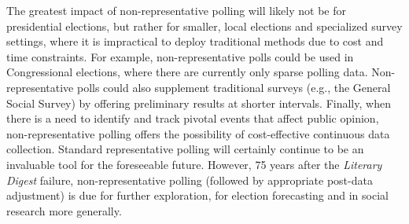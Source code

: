 \documentclass[preprint,authoryear,12pt]{elsarticle}
\begin{document}
The greatest impact of non-representative polling will likely not be for presidential elections,
but rather for smaller, local elections and specialized survey settings, where it is impractical to deploy traditional methods
due to cost and time constraints.
For example, non-representative polls could be used in Congressional elections, where there are currently only sparse polling data.
Non-representative polls could also supplement traditional surveys (e.g., the General Social Survey) by offering preliminary
results at shorter intervals.
Finally, when there is a need to identify and track pivotal events that affect public opinion, non-representative polling offers the possibility of
cost-effective continuous data collection.
Standard representative polling will certainly continue to be an invaluable tool for the foreseeable future. However,
75 years after the \textsl{Literary Digest} failure,
non-representative polling (followed by appropriate post-data adjustment) is due for further exploration, for
election forecasting and in social research more generally.


\end{document}
